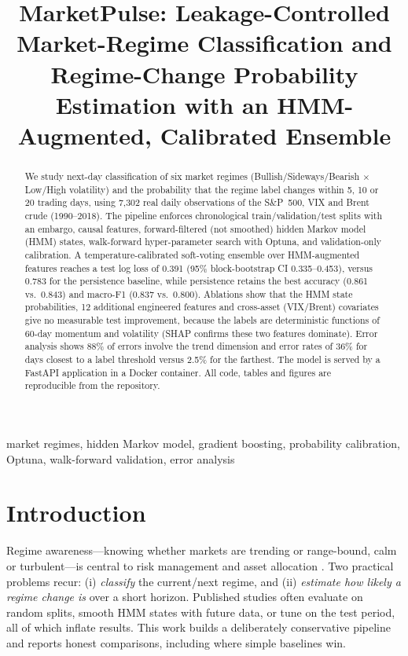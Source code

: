 \documentclass[conference]{IEEEtran}
\begin{document}
\title{MarketPulse: Leakage-Controlled Market-Regime Classification and Regime-Change Probability Estimation with an HMM-Augmented, Calibrated Ensemble}
\author{}
\maketitle

\begin{abstract}
We study next-day classification of six market regimes (Bullish/Sideways/Bearish $\times$ Low/High volatility) and the probability that the regime label changes within 5, 10 or 20 trading days, using 7{,}302 real daily observations of the S\&P~500, VIX and Brent crude (1990--2018). The pipeline enforces chronological train/validation/test splits with an embargo, causal features, forward-filtered (not smoothed) hidden Markov model (HMM) states, walk-forward hyper-parameter search with Optuna, and validation-only calibration. A temperature-calibrated soft-voting ensemble over HMM-augmented features reaches a test log loss of 0.391 (95\% block-bootstrap CI 0.335--0.453), versus 0.783 for the persistence baseline, while persistence retains the best accuracy (0.861 vs.\ 0.843) and macro-F1 (0.837 vs.\ 0.800). Ablations show that the HMM state probabilities, 12 additional engineered features and cross-asset (VIX/Brent) covariates give no measurable test improvement, because the labels are deterministic functions of 60-day momentum and volatility (SHAP confirms these two features dominate). Error analysis shows 88\% of errors involve the trend dimension and error rates of 36\% for days closest to a label threshold versus 2.5\% for the farthest. The model is served by a FastAPI application in a Docker container. All code, tables and figures are reproducible from the repository.
\end{abstract}
\begin{IEEEkeywords}
market regimes, hidden Markov model, gradient boosting, probability calibration, Optuna, walk-forward validation, error analysis
\end{IEEEkeywords}

\section{Introduction}
Regime awareness---knowing whether markets are trending or range-bound, calm or turbulent---is central to risk management and asset allocation \cite{hamilton89,angbekaert02,kritzman12}. Two practical problems recur: (i) \emph{classify} the current/next regime, and (ii) \emph{estimate how likely a regime change is} over a short horizon. Published studies often evaluate on random splits, smooth HMM states with future data, or tune on the test period, all of which inflate results. This work builds a deliberately conservative pipeline and reports honest comparisons, including where simple baselines win.
\end{document}
